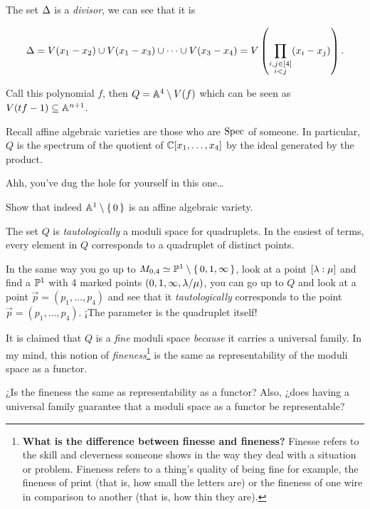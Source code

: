 \documentclass[12pt]{memoir}
\begin{document}
\begin{ptcb}
    The set \(\Delta\) is a \emph{divisor}, we can see that it is

    \[\Delta=V(x_1-x_2)\cup V(x_1-x_3)\cup\cdots\cup V(x_3-x_4)=V\left(\prod_{\substack{i,j\in\left\lbrack4\right\rbrack\\ i<j}}(x_i-x_j)\right).\]

    Call this polynomial \(f\), then \(Q=\mathbb{A}^4\setminus V(f)\) which can be seen as \(V(tf-1)\subseteq \mathbb{A}^{n+1}\).
\end{ptcb}

\begin{Rmk}
    Recall affine algebraic varieties are those who are \(\operatorname{Spec}\) of someone. In particular, \(Q\) is the spectrum of the quotient of \(\mathbb{C}[x_1,\dots,x_4]\) by the ideal generated by the product.
\end{Rmk}

Ahh, you've dug the hole for yourself in this one\dots

\begin{Ej}
    Show that indeed \(\mathbb{A}^1\setminus\{\,0\,\}\) is an affine algebraic variety.
\end{Ej}

The set \(Q\) is \emph{tautologically} a moduli space for quadruplets. In the easiest of terms, every element in \(Q\) corresponds to a quadruplet of distinct points.\par
In the same way you go up to \(M_{0,4}\simeq\mathbb{P}^1\setminus\{\,0,1,\infty\,\}\), look at a point \([\lambda:\mu]\) and find a \(\mathbb{P}^1\) with 4 marked points \((0,1,\infty,\lambda/\mu)\), you can go up to \(Q\) and look at a point \(\vec{p}=(p_1,\dots,p_4)\) and see that it \emph{tautologically} corresponds to the point \(\vec p=(p_1,\dots,p_4)\). ¡The parameter is the quadruplet itself!\par
It is claimed that \(Q\) is a \emph{fine} moduli space \emph{because} it carries a universal family. In my mind, this notion of \emph{fineness}\footnote{\textbf{What is the difference between finesse and fineness?}
    Finesse refers to the skill and cleverness someone shows in the way they deal with a situation or problem. Fineness refers to a thing's quality of being fine for example, the fineness of print (that is, how small the letters are) or the fineness of one wire in comparison to another (that is, how thin they are).} is the same as representability of the moduli space as a functor.

\begin{Ej}
    ¿Is the fineness the same as representability as a functor? Also, ¿does having a universal family guarantee that a moduli space as a functor be representable?
\end{Ej}
\end{document}
